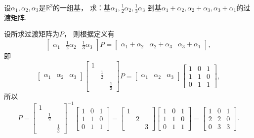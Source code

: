 \begin{example}
设\(\alpha_1,\alpha_2,\alpha_3\)是\(\mathbb{R}^3\)的一组基，
求：基\(\alpha_1,\frac12\alpha_2,\frac13\alpha_3\)
到基\(\alpha_1+\alpha_2,\alpha_2+\alpha_3,\alpha_3+\alpha_1\)的过渡矩阵.
\begin{solution}
设所求过渡矩阵为\(P\)，
则根据定义有\begin{equation*}
	\begin{bmatrix}
		\alpha_1 & \frac12\alpha_2 & \frac13\alpha_3
	\end{bmatrix} P
	= \begin{bmatrix}
		\alpha_1+\alpha_2 & \alpha_2+\alpha_3 & \alpha_3+\alpha_1
	\end{bmatrix},
\end{equation*}
即\begin{equation*}
	\begin{bmatrix}
		\alpha_1 & \alpha_2 & \alpha_3
	\end{bmatrix}
	\begin{bmatrix}
		1 \\
		& \frac12 \\
		&& \frac13
	\end{bmatrix} P
	= \begin{bmatrix}
	\alpha_1 & \alpha_2 & \alpha_3
	\end{bmatrix}
	\begin{bmatrix}
		1 & 0 & 1 \\
		1 & 1 & 0 \\
		0 & 1 & 1
	\end{bmatrix},
\end{equation*}
所以\begin{equation*}
	P = \begin{bmatrix}
		1 \\
		& \frac12 \\
		&& \frac13
	\end{bmatrix}^{-1}
	\begin{bmatrix}
		1 & 0 & 1 \\
		1 & 1 & 0 \\
		0 & 1 & 1
	\end{bmatrix}
	= \begin{bmatrix}
		1 \\
		& 2 \\
		&& 3
	\end{bmatrix} \begin{bmatrix}
		1 & 0 & 1 \\
		1 & 1 & 0 \\
		0 & 1 & 1
	\end{bmatrix}
	= \begin{bmatrix}
		1 & 0 & 1 \\
		2 & 2 & 0 \\
		0 & 3 & 3
	\end{bmatrix}.
\end{equation*}
\end{solution}
\end{example}

